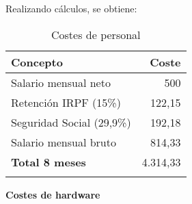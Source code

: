 Realizando cálculos, se obtiene:
\begin{longtable}[]{@{}lr@{}}
	\toprule
	\begin{minipage}[b]{0.38\columnwidth}\raggedright\strut
		\textbf{Concepto}\strut
	\end{minipage} & \begin{minipage}[b]{0.20\columnwidth}\raggedright\strut
		\textbf{Coste}\strut
	\end{minipage}\tabularnewline
	\midrule
	\endhead
	\begin{minipage}[t]{0.38\columnwidth}\raggedright\strut
		Salario mensual neto\strut
	\end{minipage} & \begin{minipage}[t]{0.20\columnwidth}\raggedright\strut
		500 \officialeuro\strut
	\end{minipage}\tabularnewline
	\begin{minipage}[t]{0.38\columnwidth}\raggedright\strut
		Retención IRPF (15\%)\strut
	\end{minipage} & \begin{minipage}[t]{0.20\columnwidth}\raggedright\strut
		122,15 \officialeuro\strut
	\end{minipage}\tabularnewline
	\begin{minipage}[t]{0.38\columnwidth}\raggedright\strut
		Seguridad Social (29,9\%)\strut
	\end{minipage} & \begin{minipage}[t]{0.20\columnwidth}\raggedright\strut
		192,18 \officialeuro\strut
	\end{minipage}\tabularnewline
	\begin{minipage}[t]{0.38\columnwidth}\raggedright\strut
		Salario mensual bruto\strut
	\end{minipage} & \begin{minipage}[t]{0.20\columnwidth}\raggedright\strut
		814,33 \officialeuro\strut
	\end{minipage}\tabularnewline
	\midrule
	\begin{minipage}[t]{0.38\columnwidth}\raggedright\strut
		\textbf{Total 8 meses}\strut
	\end{minipage} & \begin{minipage}[t]{0.20\columnwidth}\raggedright\strut
		4.314,33 \officialeuro\strut
	\end{minipage}\tabularnewline
	\bottomrule
	\caption{Costes de personal}
\end{longtable}

\textbf{Costes de hardware}

